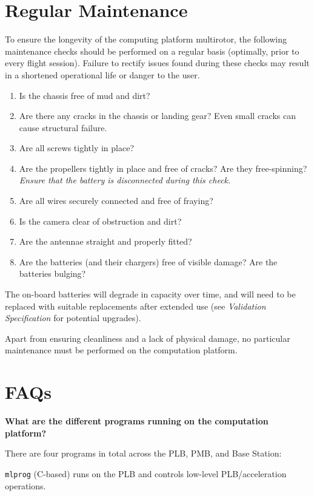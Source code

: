 \documentclass[10pt,letterpaper]{article}
\begin{document}
\section{Regular Maintenance}


To ensure the longevity of the computing platform multirotor, the following maintenance checks should be performed on a regular basis (optimally, prior to every flight session). Failure to rectify issues found during these checks may result in a shortened operational life or danger to the user.

\begin{enumerate}
\item Is the chassis free of mud and dirt?
\item Are there any cracks in the chassis or landing gear? Even small cracks can cause structural failure.
\item Are all screws tightly in place?
\item Are the propellers tightly in place and free of cracks? Are they free-spinning? \textit{Ensure that the battery is disconnected during this check.}
\item Are all wires securely connected and free of fraying?
\item Is the camera clear of obstruction and dirt?
\item Are the antennae straight and properly fitted?
\item Are the batteries (and their chargers) free of visible damage? Are the batteries bulging?
\end{enumerate}

The on-board batteries will degrade in capacity over time, and will need to be replaced with suitable replacements after extended use (see \textit{Validation Specification} for potential upgrades).

Apart from ensuring cleanliness and a lack of physical damage, no particular maintenance must be performed on the computation platform.

\section{FAQs}
\textbf{What are the different programs running on the computation platform?}

There are four programs in total across the PLB, PMB, and Base Station:

\texttt{mlprog} (C-based) runs on the PLB and controls low-level PLB/acceleration operations.
\end{document}
